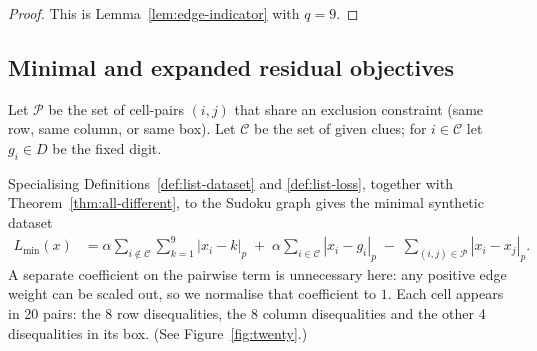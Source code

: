 \documentclass[11pt]{article}
\begin{document}
\begin{proof}
This is Lemma~\ref{lem:edge-indicator} with \(q=9\).
\end{proof}

\subsection{Minimal and expanded residual objectives}
Let $\mathcal{P}$ be the set of cell-pairs $(i,j)$ that share an exclusion constraint (same row, same column, or same box). Let $\mathcal{C}$ be the set of given clues; for $i\in\mathcal{C}$ let $g_i\in D$ be the fixed digit.

Specialising Definitions~\ref{def:list-dataset} and \ref{def:list-loss}, together with Theorem~\ref{thm:all-different}, to the Sudoku graph gives the minimal synthetic dataset
\begin{align}
L_{\min}(x) &=
\alpha\sum_{i\notin\mathcal{C}}\sum_{k=1}^9 |x_i-k|_p
\;+\;
\alpha\sum_{i\in\mathcal{C}} |x_i-g_i|_p
\;-\;
\sum_{(i,j)\in\mathcal{P}} |x_i-x_j|_p.
\label{eq:objective-minimal}
\end{align}
A separate coefficient on the pairwise term is unnecessary here: any positive edge weight can be scaled out, so we normalise that coefficient to \(1\).
Each cell appears in 20 pairs: the 8 row disequalities, the 8 column disequalities and the other 4 disequalities in its box. (See Figure~\ref{fig:twenty}.)
\end{document}
